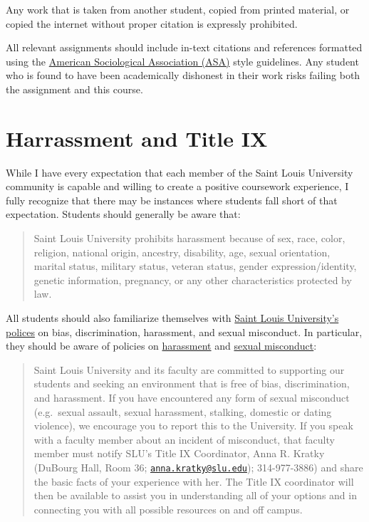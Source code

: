 \documentclass[]{book}
\theoremstyle{definition}
\theoremstyle{definition}
\theoremstyle{definition}
\theoremstyle{remark}
\begin{document}
Any work that is taken from another student, copied from printed
material, or copied the internet without proper citation is expressly
prohibited.

All relevant assignments should include in-text citations and references
formatted using the
\href{https://owl.english.purdue.edu/owl/resource/583/1/}{American
Sociological Association (ASA)} style guidelines. Any student who is
found to have been academically dishonest in their work risks failing
both the assignment and this course.

\hypertarget{harrassment-and-title-ix}{%
\section{Harrassment and Title IX}\label{harrassment-and-title-ix}}

While I have every expectation that each member of the Saint Louis
University community is capable and willing to create a positive
coursework experience, I fully recognize that there may be instances
where students fall short of that expectation. Students should generally
be aware that:

\begin{quote}
Saint Louis University prohibits harassment because of sex, race, color,
religion, national origin, ancestry, disability, age, sexual
orientation, marital status, military status, veteran status, gender
expression/identity, genetic information, pregnancy, or any other
characteristics protected by law.
\end{quote}

All students should also familiarize themselves with
\href{http://www.slu.edu/general-counsel-home/office-of-institutional-equity-and-diversity}{Saint
Louis University's polices} on bias, discrimination, harassment, and
sexual misconduct. In particular, they should be aware of policies on
\href{https://www.slu.edu/general-counsel/institutional-equity-diversity/pdfs/harassment-policy.pdf}{harassment}
and
\href{https://www.slu.edu/about/safety/sexual-assault-resources.php}{sexual
misconduct}:

\begin{quote}
Saint Louis University and its faculty are committed to supporting our
students and seeking an environment that is free of bias,
discrimination, and harassment. If you have encountered any form of
sexual misconduct (e.g.~sexual assault, sexual harassment, stalking,
domestic or dating violence), we encourage you to report this to the
University. If you speak with a faculty member about an incident of
misconduct, that faculty member must notify SLU's Title IX Coordinator,
Anna R. Kratky (DuBourg Hall, Room 36;
\href{mailto:anna.kratky@slu.edu}{\nolinkurl{anna.kratky@slu.edu}});
314-977-3886) and share the basic facts of your experience with her. The
Title IX coordinator will then be available to assist you in
understanding all of your options and in connecting you with all
possible resources on and off campus.
\end{quote}
\end{document}
